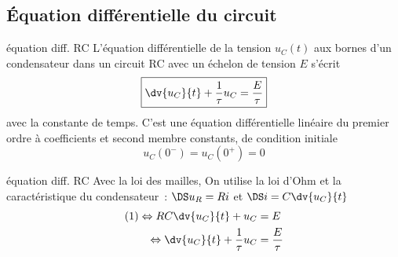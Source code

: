 \documentclass[../main/main.tex]{subfiles}
\begin{document}
\subsection{Équation différentielle du circuit}
\begin{tcbraster}[raster columns=2, raster equal height=rows]
    \begin{prop}[label=prop:eqdiffrc]{équation diff. RC}
        L'équation différentielle de la tension $u_C(t)$ aux bornes d'un
        condensateur dans un circuit RC avec un échelon de tension $E$
        s'écrit
        \[ \boxed{\dv{u_C}{t} + \frac{1}{\tau}u_C = \frac{E}{\tau}}\]
        avec  la constante de temps.
        \tcblower
        C'est une équation différentielle linéaire du premier ordre à
        coefficients et second membre constants, de condition initiale
        \[ \boxed{u_C(0^-) = u_C(0^+) = 0}\]
    \end{prop}
    \begin{demo}[label=demo:eqdiffrc]{équation diff. RC}
        Avec la loi des mailles,\smallbreak
        \linebreak
        On utilise la loi d'Ohm et la caractéristique du condensateur~:
        $\DS u_R = Ri$ et $\DS i = C \dv{u_C}{t}$
        \begin{align*}
            (1) \Leftrightarrow RC \dv{u_C}{t} + u_C        & = E\\
            \Leftrightarrow \dv{u_C}{t} + \frac{1}{\tau}u_C & = \frac{E}{\tau}
        \end{align*}
    \end{demo}
\end{tcbraster}

\vspace{-17pt}
\end{document}
